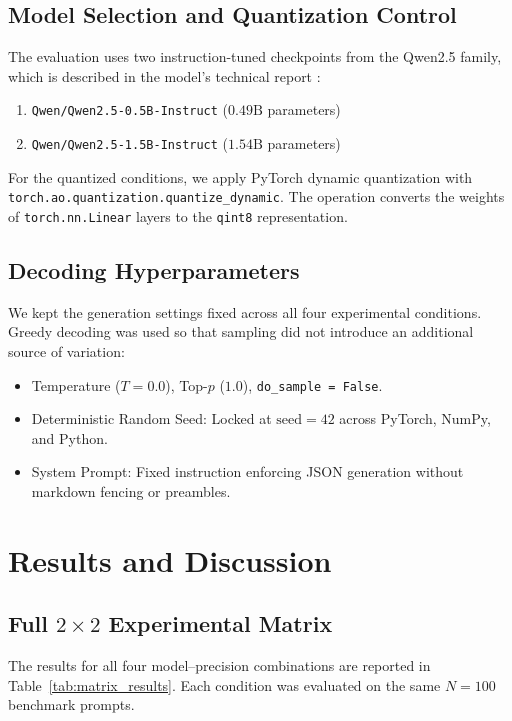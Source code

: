 \documentclass[10pt, conference, a4paper]{IEEEtran}
\begin{document}
\subsection{Model Selection and Quantization Control}
The evaluation uses two instruction-tuned checkpoints from the Qwen2.5 family, which is described in the model's technical report \cite{qwen25}:
\begin{enumerate}
    \item \texttt{Qwen/Qwen2.5-0.5B-Instruct} ($0.49\text{B}$ parameters)
    \item \texttt{Qwen/Qwen2.5-1.5B-Instruct} ($1.54\text{B}$ parameters)
\end{enumerate}

For the quantized conditions, we apply PyTorch dynamic quantization with \texttt{torch.ao.quantization.quantize\_dynamic}. The operation converts the weights of \texttt{torch.nn.Linear} layers to the \texttt{qint8} representation.

\subsection{Decoding Hyperparameters}
We kept the generation settings fixed across all four experimental conditions. Greedy decoding was used so that sampling did not introduce an additional source of variation:
\begin{itemize}
    \item Temperature ($T = 0.0$), Top-$p$ ($1.0$), \texttt{do\_sample = False}.
    \item Deterministic Random Seed: Locked at $\text{seed} = 42$ across PyTorch, NumPy, and Python.
    \item System Prompt: Fixed instruction enforcing JSON generation without markdown fencing or preambles.
\end{itemize}

\section{Results and Discussion}

\subsection{Full $2 \times 2$ Experimental Matrix}
The results for all four model--precision combinations are reported in Table~\ref{tab:matrix_results}. Each condition was evaluated on the same $N=100$ benchmark prompts.
\end{document}
